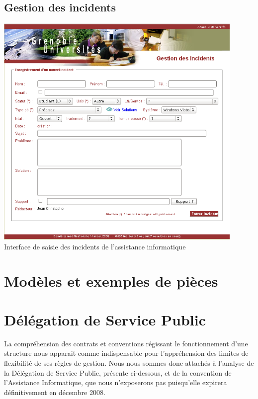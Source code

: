 \subsection{Gestion des incidents}
\label{gestion_incidents}
\begin{center}
	\includegraphics[width=12cm]{annexes/images/gestion_des_incidents.png} \\
	Interface de saisie des incidents de l'assistance informatique
\end{center}

\section{Modèles et exemples de pièces}


\section{Délégation de Service Public}

La compréhension des contrats et conventions régissant le fonctionnement d'une
structure nous apparait comme indispensable pour l'appréhension des limites de
flexibilité de ses règles de gestion. Nous nous sommes donc attachés à l'analyse
de la Délégation de Service Public, présente ci-dessous, et de la convention
de l'Assistance Informatique, que nous n'exposerons pas puisqu'elle expirera 
définitivement en décembre 2008.

\newpage
\begin{center}
	
\end{center}

